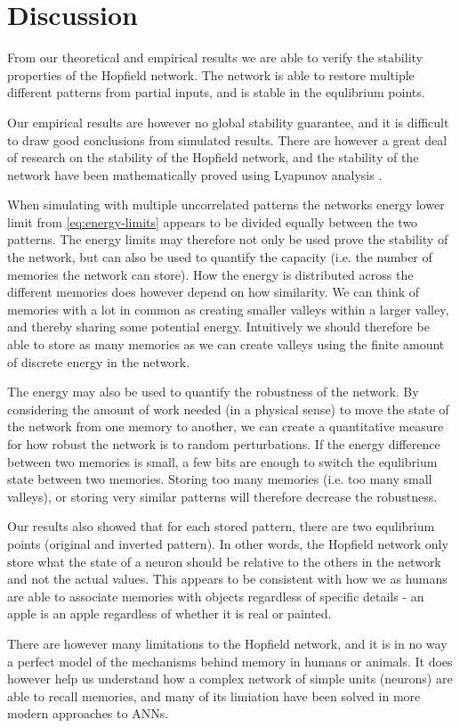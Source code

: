 \section{Discussion}

From our theoretical and empirical results we are able to verify the stability properties of the Hopfield network. The network is able to restore multiple different patterns from partial inputs, and is stable in the equlibrium points. 

Our empirical results are however no global stability guarantee, and it is difficult to draw good conclusions from simulated results. There are however a great deal of research on the stability of the Hopfield network, and the stability of the network have been mathematically proved using Lyapunov analysis \cite{lyapnuv-stability}.

When simulating with multiple uncorrelated patterns the networks energy lower limit from \cref{eq:energy-limits} appears to be divided equally between the two patterns. The energy limits may therefore not only be used prove the stability of the network, but can also be used to quantify the capacity (i.e. the number of memories the network can store). How the energy is distributed across the different memories does however depend on how similarity. We can think of memories with a lot in common as creating smaller valleys within a larger valley, and thereby sharing some potential energy. Intuitively we should therefore be able to store as many memories as we can create valleys using the finite amount of discrete energy in the network. 

The energy may also be used to quantify the robustness of the network. By considering the amount of work needed (in a physical sense) to move the state of the network from one memory to another, we can create a quantitative measure for how robust the network is to random perturbations. If the energy difference between two memories is small, a few bits are enough to switch the equlibrium state between two memories. Storing too many memories (i.e. too many small valleys), or storing very similar patterns will therefore decrease the robustness.

Our results also showed that for each stored pattern, there are two equlibrium points (original and inverted pattern).  In other words, the Hopfield network only store what the state of a neuron should be relative to the others in the network and not the actual values. This appears to be consistent with how we as humans are able to associate memories with objects regardless of specific details - an apple is an apple regardless of whether it is real or painted.

There are however many limitations to the Hopfield network, and it is in no way a perfect model of the mechanisms behind memory in humans or animals. It does however help us understand how a complex network of simple units (neurons) are able to recall memories, and many of its limiation have been solved in more modern approaches to ANNs.







